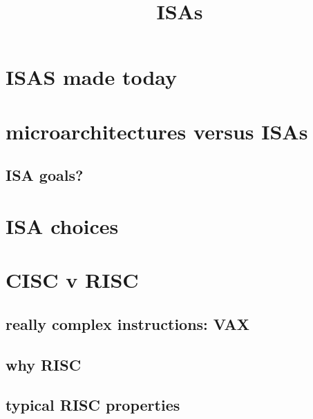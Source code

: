 \title{ISAs}
\date{}
\usepackage{xspace}
\usepackage{cancel}
\usepackage{adjustbox}

\begin{frame}
    \titlepage
\end{frame}

\usetikzlibrary{circuits.logic.US}


\section{ISAS made today}


\section{microarchitectures versus ISAs}




\subsection{ISA goals?}


\section{ISA choices}


\section{CISC v RISC}



\subsection{really complex instructions: VAX}



\subsection{why RISC}



\subsection{typical RISC properties}

